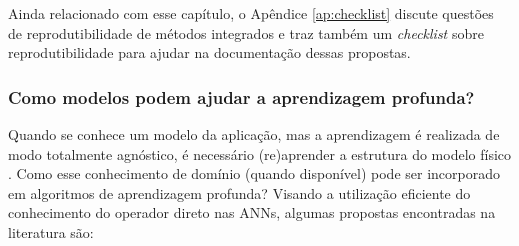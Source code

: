 Ainda relacionado com esse capítulo, o Apêndice \ref{ap:checklist} discute questões de reprodutibilidade de métodos integrados e traz também um \textit{checklist} sobre reprodutibilidade para ajudar na documentação dessas propostas. 


\subsubsection{Como modelos podem ajudar a aprendizagem profunda?}

Quando se conhece um modelo da aplicação, mas a aprendizagem é realizada de modo totalmente agnóstico, é necessário (re)aprender a estrutura do modelo físico \cite{Lunz2018}. Como esse conhecimento de domínio (quando disponível) pode ser incorporado em algoritmos de aprendizagem profunda? Visando a utilização eficiente do conhecimento do operador direto nas ANNs, algumas propostas encontradas na literatura são:
